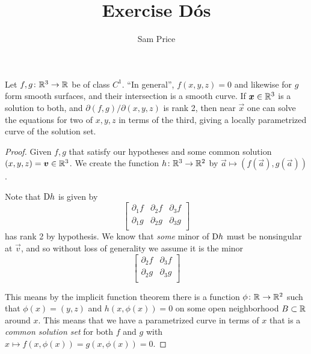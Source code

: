 \documentclass{article}
\author{Sam Price}
\title{Exercise D\'os}
\begin{document}
\maketitle

Let $f, g \from \RR[3] \to \RR$ be of class $C^{1}$.
``In general'', $f(x, y, z) = 0$ and likewise for $g$ form smooth surfaces,
and their intersection is a smooth curve.
If $\vec{x} \in \RR[3]$ is a solution to both, and $\partial(f, g)/\partial(x, y, z)$ is rank 2, then
near $\vec{x}$ one can solve the equations for two of $x, y, z$ in terms of the third,
giving a locally parametrized curve of the solution set.

\begin{proof}
  Given $f, g$ that satisfy our hypotheses and some common solution $(x, y, z) = \vec{v} \in \RR[3]$.
  We create the function $h \from \RR[3] \to \RR[2]$ by $\vec{a} \mapsto (f(\vec{a}), g(\vec{a}))$.

  Note that $\D h$ is given by
  \[ \begin{bmatrix}
    \partial_1f & \partial_2f & \partial_3f\\
    \partial_1g & \partial_2g & \partial_3g\\
  \end{bmatrix} \]
  has rank 2 by hypothesis.
  We know that \emph{some} minor of $\D h$ must be nonsingular at $\vec{v}$, and so without loss of generality we assume it is the minor
  \[ \begin{bmatrix}
    \partial_{2} f & \partial_{3} f\\
    \partial_{2} g & \partial_{3} g\\
  \end{bmatrix} \]

  This means by the implicit function theorem there is a function $\phi \from \RR \to \RR[2]$
  such that $\phi(x) = (y, z)$ and $h(x, \phi(x)) = 0$ on some open neighborhood $B \subset \RR$ around $x$.
  This means that we have a parametrized curve in terms of $x$ that is a
  \emph{common solution set} for both $f$ and $g$ with $x \mapsto f(x, \phi(x)) = g(x, \phi(x)) = 0$.
\end{proof}
\end{document}
